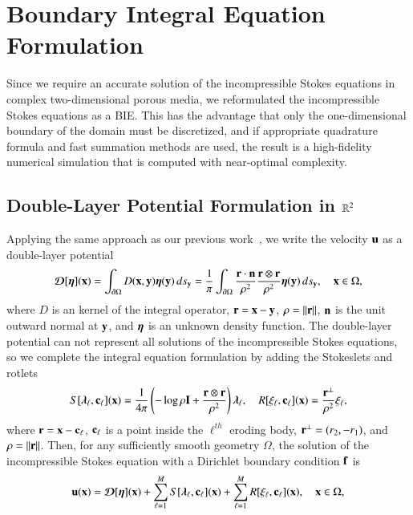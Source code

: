 \documentclass[preprint,10pt]{elsarticle}
\begin{document}
\section{Boundary Integral Equation Formulation}
\label{sec:DLP}
Since we require an accurate solution of the incompressible Stokes
equations in complex two-dimensional porous media, we reformulated the
incompressible Stokes equations as a BIE.  This has the advantage that
only the one-dimensional boundary of the domain must be discretized, and
if appropriate quadrature formula and fast summation methods are used,
the result is a high-fidelity numerical simulation that is computed with
near-optimal complexity.

\subsection{Double-Layer Potential Formulation in ${\mathbb{R}}^2$}
Applying the same approach as our previous work~\cite{qua-moo2018}, we
write the velocity ${\mathbf{u}}$ as a double-layer potential 
\begin{align}
  {\boldsymbol{\mathcal D}}[{\boldsymbol\eta}]({\mathbf{x}}) = \int_{{\partial}\Omega} D({\mathbf{x}},{\mathbf{y}}) {\boldsymbol\eta}({\mathbf{y}})\, ds_{\mathbf{y}} = 
  \frac{1}{\pi}\int_{{\partial}\Omega} 
    \frac{{\mathbf{r}} \cdot {\mathbf{n}}}{\rho^2} \frac{{\mathbf{r}} \otimes {\mathbf{r}}}{\rho^2}
    {\boldsymbol\eta}({\mathbf{y}}) \, ds_{\mathbf{y}}, \quad {\mathbf{x}} \in \Omega,
  \label{eqn:velocityDLP}
\end{align}
where $D$ is an kernel of the integral operator, ${\mathbf{r}} = {\mathbf{x}} - {\mathbf{y}}$,
$\rho = \|{\mathbf{r}}\|$, ${\mathbf{n}}$ is the unit outward normal at ${\mathbf{y}}$, and ${\boldsymbol\eta}$
is an unknown density function.  The double-layer potential can not
represent all solutions of the incompressible Stokes equations, so we
complete the integral equation formulation by adding the Stokeslets and
rotlets~\cite{pow-mir1987}
\begin{align}
  S[{\boldsymbol\lambda}_\ell,{\mathbf{c}}_\ell]({\mathbf{x}}) = \frac{1}{4\pi} \left( 
    -\log \rho {\mathbf{I}} + \frac{{\mathbf{r}} \otimes {\mathbf{r}}}{\rho^2}
    \right){\boldsymbol\lambda}_\ell, \quad
  R[\xi_\ell,{\mathbf{c}}_\ell]({\mathbf{x}}) = \frac{{\mathbf{r}}^\perp}{\rho^2} \xi_\ell,
\end{align}
where ${\mathbf{r}} = {\mathbf{x}} - {\mathbf{c}}_\ell$, ${\mathbf{c}}_\ell$ is a point inside the
$\ell^{th}$ eroding body, ${\mathbf{r}}^\perp = (r_2,-r_1)$, and $\rho =
\|{\mathbf{r}}\|$.  Then, for any sufficiently smooth geometry $\Omega$, the
solution of the incompressible Stokes equation with a Dirichlet boundary
condition ${\mathbf{f}}$ is
\begin{align}
  {\mathbf{u}}({\mathbf{x}}) = {\boldsymbol{\mathcal D}}[{\boldsymbol\eta}]({\mathbf{x}}) + 
    \sum_{\ell=1}^M S[{\boldsymbol\lambda}_\ell,{\mathbf{c}}_\ell]({\mathbf{x}}) + 
    \sum_{\ell=1}^M R[\xi_\ell,{\mathbf{c}}_\ell]({\mathbf{x}}), \quad {\mathbf{x}} \in \Omega,
\end{align}
\end{document}
